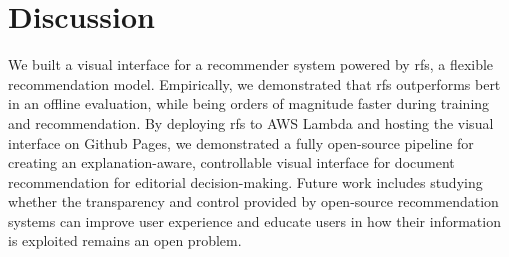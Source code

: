 \section{Discussion}
We built a visual interface for a recommender system powered by \gls{rfs}, a flexible recommendation model. Empirically, we demonstrated that \gls{rfs} outperforms \acrshort{bert} in an offline evaluation, while being orders of magnitude faster during training and recommendation. By deploying \gls{rfs} to AWS Lambda and hosting the visual interface on Github Pages, we demonstrated a fully open-source pipeline for creating an explanation-aware, controllable visual interface for document recommendation for editorial decision-making. Future work includes studying whether the transparency and control provided by open-source recommendation systems can improve user experience and educate users in how their information is exploited remains an open problem.